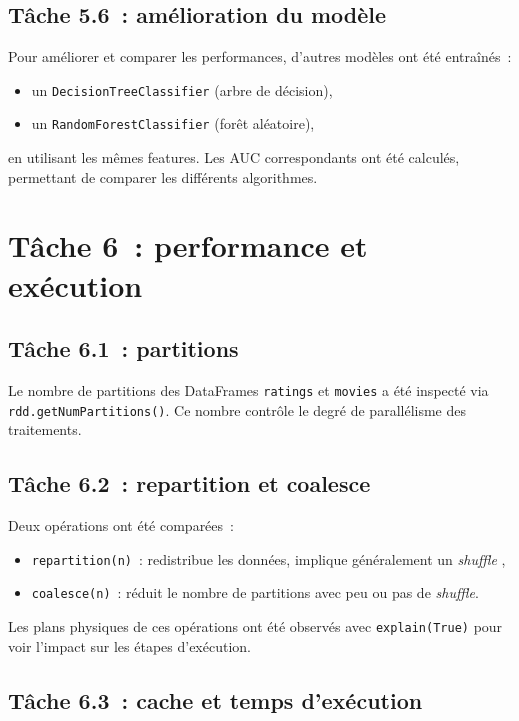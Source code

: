 \documentclass[a4paper,11pt]{article}
\begin{document}
\subsection{Tâche 5.6~: amélioration du modèle}

Pour améliorer et comparer les performances, d'autres modèles
ont été entraînés~:
\begin{itemize}
  \item un \texttt{DecisionTreeClassifier} (arbre de décision),
  \item un \texttt{RandomForestClassifier} (forêt aléatoire),
\end{itemize}

en utilisant les mêmes features. Les AUC correspondants ont été
calculés, permettant de comparer les différents algorithmes.

\section{Tâche 6~: performance et exécution}

\subsection{Tâche 6.1~: partitions}

Le nombre de partitions des DataFrames \texttt{ratings} et
\texttt{movies} a été inspecté via
\texttt{rdd.getNumPartitions()}. Ce nombre contrôle le degré
de parallélisme des traitements.

\subsection{Tâche 6.2~: repartition et coalesce}

Deux opérations ont été comparées~:
\begin{itemize}
  \item \texttt{repartition(n)}~: redistribue les données, implique
        généralement un \emph{shuffle} ,
  \item \texttt{coalesce(n)}~: réduit le nombre de partitions avec
        peu ou pas de \emph{shuffle}.
\end{itemize}

Les plans physiques de ces opérations ont été observés avec
\texttt{explain(True)} pour voir l'impact sur les étapes
d'exécution.

\subsection{Tâche 6.3~: cache et temps d'exécution}
\end{document}
